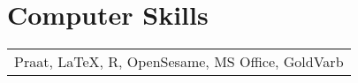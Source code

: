 \documentclass[letterpaper,10pt]{article}
\begin{document}
\section{Computer Skills}

\begin{tabular}{p{16.4cm}}
Praat, \LaTeX, R, OpenSesame, MS Office, GoldVarb
\end{tabular}







\end{document}
